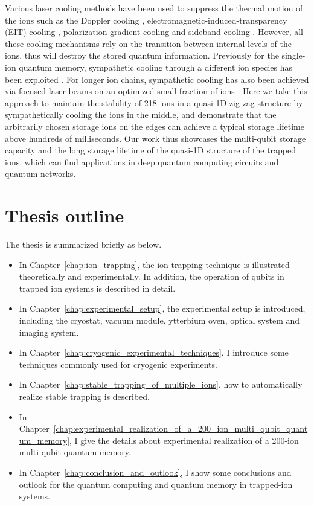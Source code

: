 Various laser cooling methods have been used to suppress the thermal motion of the ions such as the Doppler cooling \cite{leibfried2003quantum}, electromagnetic-induced-transparency (EIT) cooling \cite{qiao2021double, feng2020efficient}, polarization gradient cooling \cite{joshi2020polarization} and sideband cooling \cite{leibfried2003quantum}. However, all these cooling mechanisms rely on the transition between internal levels of the ions, thus will destroy the stored quantum information. Previously for the single-ion quantum memory, sympathetic cooling through a different ion species has been exploited \cite{wang2021single,chen2017sympathetic, blinov2002sympathetic, barrett2003sympathetic}. For longer ion chains, sympathetic cooling has also been achieved via focused laser beams on an optimized small fraction of ions \cite{mao2021experimental}. Here we take this approach to maintain the stability of 218 ions in a quasi-1D zig-zag structure by sympathetically cooling the ions in the middle, and demonstrate that the arbitrarily chosen storage ions on the edges can achieve a typical storage lifetime above hundreds of milliseconds. Our work thus showcases the multi-qubit storage capacity and the long storage lifetime of the quasi-1D structure of the trapped ions, which can find applications in deep quantum computing circuits and quantum networks.



\section{Thesis outline}
The thesis is summarized briefly as below.
\begin{itemize}
    \item In Chapter~\ref{chap:ion_trapping}, the ion trapping technique is illustrated theoretically and experimentally. In addition, the operation of qubits in trapped ion systems is described in detail.
    \item In Chapter~\ref{chap:experimental_setup}, the experimental setup is introduced, including the cryostat, vacuum module, ytterbium oven, optical system and imaging system.
    \item In Chapter~\ref{chap:cryogenic_experimental_techniques}, I introduce some techniques commonly used for cryogenic experiments.
    \item In Chapter~\ref{chap:stable_trapping_of_multiple_ions}, how to automatically realize stable trapping is described.
    \item In Chapter~\ref{chap:experimental_realization_of_a_200_ion_multi_qubit_quantum_memory}, I give the details about experimental realization of a 200-ion multi-qubit quantum memory.
    \item In Chapter~\ref{chap:conclusion_and_outlook}, I show some conclusions and outlook for the quantum computing and quantum memory in trapped-ion systems.
\end{itemize}
